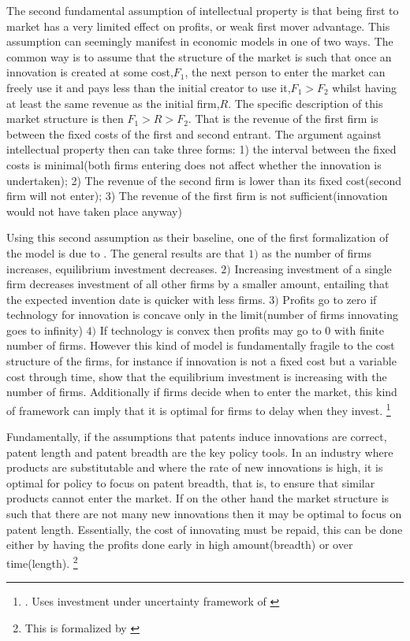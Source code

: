 \documentclass[12pt]{article}
\numberwithin{equation}{section}
\begin{document}


The second fundamental assumption of intellectual property is that being first to market has a very limited effect on profits, or weak first mover advantage. This assumption can seemingly manifest in economic models in one of two ways. The common way is to assume that the structure of the market is such that once an innovation is created at some cost,$F_1$, the next person to enter the market can freely use it and pays less than the initial creator to use it,$F_1>F_2$ whilst having at least the same revenue as the initial firm,$R$. The specific description of this market structure is then $F_1>R>F_2$. That is the revenue of the first firm is between the fixed costs of the first and second entrant. The argument against intellectual property then can take three forms: 1) the interval between the fixed costs is minimal(both firms entering does not affect whether the innovation is undertaken); 2) The revenue of the second firm is lower than its fixed cost(second firm will not enter); 3) The revenue of the first firm is not sufficient(innovation would not have taken place anyway)

Using this second assumption as their baseline, one of the first formalization of the model is due to \cite{Loury1979}. The general results are that $1)$ as the number of firms increases, equilibrium investment decreases. $2)$ Increasing investment of a single firm decreases investment of all other firms by a smaller amount, entailing that the expected invention date is quicker with less firms. $3)$ Profits go to zero if technology for innovation is concave only in the limit(number of firms innovating goes to infinity) $4)$ If technology is convex then profits may go to 0 with finite number of firms. However this kind of model is fundamentally fragile to the cost structure of the firms, for instance if innovation is not a fixed cost but a variable cost through time, \cite{lee1980market} show that the equilibrium investment is increasing with the number of firms. Additionally if firms decide when to enter the market, this kind of framework can imply that it is optimal for firms to delay when they invest. \footnote{\cite{Weeds2002}. Uses investment under uncertainty framework of \cite{dixit1994investment}}

Fundamentally, if the assumptions that patents induce innovations are correct, patent length and patent breadth are the key policy tools. In an industry where products are substitutable and where the rate of new innovations is high, it is optimal for policy to focus on patent breadth, that is, to ensure that similar products cannot enter the market. If on the other hand the market structure is such that there are not many new innovations then it may be optimal to focus on patent length. Essentially, the cost of innovating must be repaid, this can be done either by having the profits done early in high amount(breadth) or over time(length). \footnote{This is formalized by \cite{takalo2001optimal}}
\end{document}
